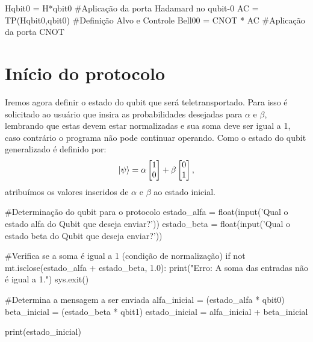 \begin{pycode}
    Hqbit0 = H*qbit0  #Aplicação da porta Hadamard no qubit-0
    AC = TP(Hqbit0,qbit0)  #Definição Alvo e Controle
    Bell00 = CNOT * AC  #Aplicação da porta CNOT
\end{pycode}

\section{Início do protocolo}\label{emaranhamento}

Iremos agora definir o estado do qubit que será teletransportado. Para isso é solicitado ao usuário que insira as probabilidades desejadas para \(\alpha\) e \(\beta\), lembrando que estas devem estar normalizadas e sua soma deve ser igual a 1, caso contrário o programa não pode continuar operando. Como o estado do qubit generalizado é definido por:
\[ \ket{\psi} =
  \alpha \begin{bmatrix} 1 \\ 0 \end{bmatrix} +
  \beta \begin{bmatrix} 0 \\ 1 \end{bmatrix},
\]
atribuímos os valores inseridos de \(\alpha\) e \(\beta\) ao estado inicial.

\begin{pycode}
    #Determinação do qubit para o protocolo
    estado_alfa = float(input('Qual o estado alfa do Qubit que deseja enviar?'))
    estado_beta = float(input('Qual o estado beta do Qubit que deseja enviar?'))

    #Verifica se a soma é igual a 1 (condição de normalização)
    if not mt.isclose(estado_alfa + estado_beta, 1.0):
        print("Erro: A soma das entradas não é igual a 1.")
        sys.exit()

    #Determina a mensagem a ser enviada
    alfa_inicial = (estado_alfa * qbit0)
    beta_inicial = (estado_beta * qbit1)
    estado_inicial = alfa_inicial + beta_inicial

    print(estado_inicial)
\end{pycode}

